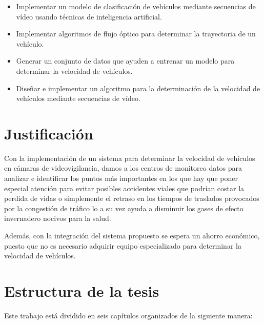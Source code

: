 \begin{itemize}
    \item Implementar un modelo de clasificación de vehículos mediante secuencias de vídeo usando técnicas de inteligencia artificial.
    \item Implementar algoritmos de flujo óptico para determinar la trayectoria de un vehículo.
    \item Generar un conjunto de datos que ayuden a entrenar un modelo para determinar la velocidad de vehículos.
    \item Diseñar e implementar un algoritmo para la determinación de la velocidad de vehículos mediante secuencias de vídeo.
\end{itemize}

\section{Justificación}

Con la implementación de un sistema para determinar la velocidad de vehículos en cámaras de videovigilancia, damos a los centros de monitoreo datos para analizar e identificar los puntos más importantes en los que hay que poner especial atención para evitar posibles accidentes viales que podrían costar la perdida de vidas o simplemente el retraso en los tiempos de traslados provocados por la congestión  de tráfico lo a su vez ayuda a disminuir los gases de efecto invernadero nocivos para la salud.

Además, con la integración del sistema propuesto se espera un ahorro económico, puesto que no es necesario adquirir equipo especializado para determinar la velocidad de vehículos.

\section{Estructura de la tesis}

Este trabajo está dividido en seis capítulos organizados de la siguiente manera:


